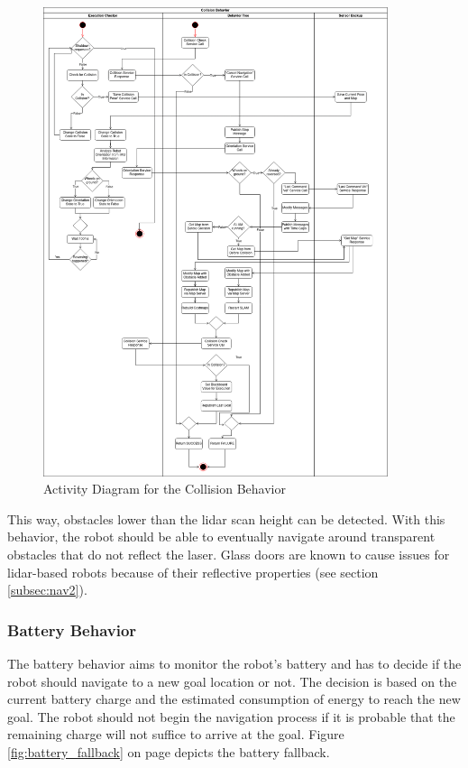%
\begin{figure}[ht!]
	\centering
	\includegraphics[width=0.90\textwidth]{images/activity_diagram_collision.png}
	\caption{Activity Diagram for the Collision Behavior}
	\label{fig:activity_diagram_collision}
\end{figure}

This way, obstacles lower than the lidar scan height can be detected. With this behavior, the robot should be able to eventually navigate around transparent obstacles that do not reflect the laser. Glass doors are known to cause issues for lidar-based robots because of their reflective properties (see section \ref{subsec:nav2}).

\subsubsection{Battery Behavior}

The battery behavior aims to monitor the robot's battery and has to decide if the robot should navigate to a new goal location or not. The decision is based on the current battery charge and the estimated consumption of energy to reach the new goal. The robot should not begin the navigation process if it is probable that the remaining charge will not suffice to arrive at the goal. Figure \ref{fig:battery_fallback} on page \pageref{fig:battery_fallback} depicts the battery fallback.

